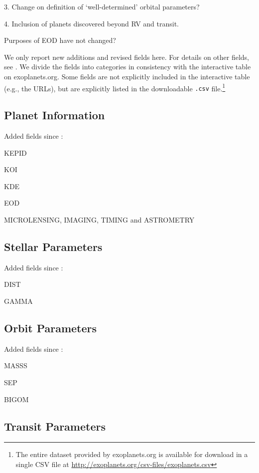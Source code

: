 \documentclass[11pt,preprint]{aastex}
\begin{document}
\begin{CJK*}{UTF8}{gbsn}
3. Change on definition of `well-determined' orbital parameters?

4. Inclusion of planets discovered beyond RV and transit.

Purposes of EOD have not changed?

We only report new additions and revised fields here. For details on
other fields, see \cite{Wright2011}. We divide the fields into
categories in consistency with the interactive table on
exoplanets.org. Some fields are not explicitly included in the
interactive table (e.g., the URLs), but are explicitly listed in the
downloadable {\tt .csv} file.\footnote{The entire dataset provided by
  exoplanets.org is available for download in a single CSV file at
  \url{http://exoplanets.org/csv-files/exoplanets.csv}}

\subsection{Planet Information}

Added fields since \cite{Wright2011}:

KEPID

KOI

KDE

EOD

MICROLENSING, IMAGING, TIMING and ASTROMETRY

\subsection{Stellar Parameters}

Added fields since \cite{Wright2011}:

DIST

GAMMA

\subsection{Orbit Parameters}

Added fields since \cite{Wright2011}:

MASSS

SEP

BIGOM

\subsection{Transit Parameters}


\end{CJK*}
\end{document}
